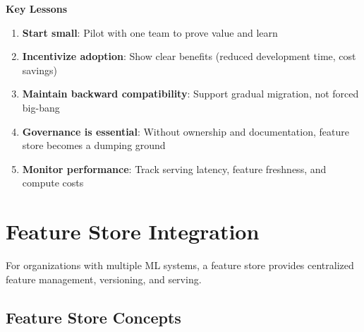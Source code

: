 \textbf{Key Lessons}

\begin{enumerate}
    \item \textbf{Start small}: Pilot with one team to prove value and learn
    \item \textbf{Incentivize adoption}: Show clear benefits (reduced development time, cost savings)
    \item \textbf{Maintain backward compatibility}: Support gradual migration, not forced big-bang
    \item \textbf{Governance is essential}: Without ownership and documentation, feature store becomes a dumping ground
    \item \textbf{Monitor performance}: Track serving latency, feature freshness, and compute costs
\end{enumerate}

\section{Feature Store Integration}

For organizations with multiple ML systems, a feature store provides centralized feature management, versioning, and serving.

\subsection{Feature Store Concepts}

